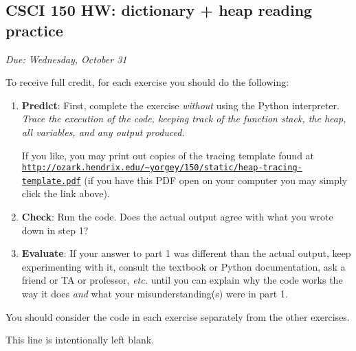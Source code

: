 \documentclass[]{article}
\date{}
\begin{document}
\subsection{CSCI 150 HW: dictionary + heap reading
practice}\label{csci-150-hw-dictionary-heap-reading-practice}

\emph{Due: Wednesday, October 31}

To receive full credit, for each exercise you should do the following:

\begin{enumerate}
\def\labelenumi{\arabic{enumi}.}
\item
  \textbf{Predict}: First, complete the exercise \emph{without} using
  the Python interpreter. \emph{Trace the execution of the code, keeping
  track of the function stack, the heap, all variables, and any output
  produced.}

  If you like, you may print out copies of the tracing template found at
  \href{http://ozark.hendrix.edu/~yorgey/150/static/heap-tracing-template.pdf}{\texttt{http://ozark.hendrix.edu/\textasciitilde{}yorgey/150/static/heap-tracing-template.pdf}}
  (if you have this PDF open on your computer you may simply click the
  link above).
\item
  \textbf{Check}: Run the code. Does the actual output agree with what
  you wrote down in step 1?
\item
  \textbf{Evaluate}: If your answer to part 1 was different than the
  actual output, keep experimenting with it, consult the textbook or
  Python documentation, ask a friend or TA or professor, \emph{etc.}
  until you can explain why the code works the way it does \emph{and}
  what your misunderstanding(s) were in part 1.
\end{enumerate}

You should consider the code in each exercise separately from the other
exercises.

This line is intentionally left blank.
\end{document}

